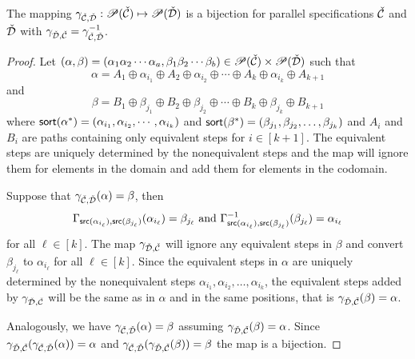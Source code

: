 \begin{proposition}
The mapping $\gamma_{\check{\mathcal{C}},\check{\mathcal{D}}}: \mathscr{P}(\check{\mathcal{C}}) \mapsto \mathscr{P}(\check{\mathcal{D}})$ is a bijection for parallel specifications $\check{\mathcal{C}}$ and $\check{\mathcal{D}}$ with $\gamma_{\check{\mathcal{D}},\check{\mathcal{C}}} = \gamma_{\check{\mathcal{C}},\check{\mathcal{D}}}^{-1}$.
\end{proposition}
\begin{proof}
Let $(\alpha,\beta) = (\alpha_1\alpha_2\dotsm\alpha_a,\beta_1\beta_2\dotsm\beta_b)\in \mathscr{P}(\check{\mathcal{C}}) \times \mathscr{P}(\check{\mathcal{D}})$ such that
\[
    \alpha = A_1 \oplus \alpha_{i_1} \oplus A_2 \oplus \alpha_{i_2} \oplus \dotsm \oplus A_k \oplus \alpha_{i_k} \oplus A_{k+1}
\]
and
\[
    \beta = B_1 \oplus \beta_{j_1} \oplus B_2 \oplus \beta_{j_2} \oplus \dotsm \oplus B_k \oplus \beta_{j_k} \oplus B_{k+1}
\]
where $\textsf{sort}(\alpha^\ast) = (\alpha_{i_1},\alpha_{i_2},\dotsm,\alpha_{i_k})$ and $\textsf{sort}(\beta^\ast) = (\beta_{j_1},\beta_{j_2},\dotsc,\beta_{j_k})$ and $A_i$ and $B_i$ are paths containing only equivalent steps for $i \in [k+1]$. The equivalent steps are uniquely determined by the nonequivalent steps and the map will ignore them for elements in the domain and add them for elements in the codomain.

Suppose that $\gamma_{\check{\mathcal{C}},\check{\mathcal{D}}}(\alpha) = \beta$, then
\[
    \Gamma_{\textsf{src}(\alpha_{i_\ell}),\textsf{src}(\beta_{j_\ell})}(\alpha_{i_\ell}) = \beta_{j_\ell} \text{ and }
    \Gamma_{\textsf{src}(\alpha_{i_\ell}),\textsf{src}(\beta_{j_\ell})}^{-1}(\beta_{j_\ell}) = \alpha_{i_\ell}
\]
for all $\ell \in [k]$. The map $\gamma_{\check{\mathcal{D}},\check{\mathcal{C}}}$ will ignore any equivalent steps in $\beta$ and convert $\beta_{j_\ell}$ to $\alpha_{i_\ell}$ for all $\ell \in [k]$. Since the equivalent steps in $\alpha$ are uniquely determined by the nonequivalent steps $\alpha_{i_1}, \alpha_{i_2}, \dotsc, \alpha_{i_k}$, the equivalent steps added by $\gamma_{\check{\mathcal{D}},\check{\mathcal{C}}}$ will be the same as in $\alpha$ and in the same positions, that is $\gamma_{\check{\mathcal{D}},\check{\mathcal{C}}}(\beta) = \alpha$.

Analogously, we have $\gamma_{\check{\mathcal{C}},\check{\mathcal{D}}}(\alpha) = \beta$ assuming $\gamma_{\check{\mathcal{D}},\check{\mathcal{C}}}(\beta) = \alpha$. Since $\gamma_{\check{\mathcal{D}},\check{\mathcal{C}}}(\gamma_{\check{\mathcal{C}},\check{\mathcal{D}}}(\alpha)) = \alpha$ and $\gamma_{\check{\mathcal{C}},\check{\mathcal{D}}}(\gamma_{\check{\mathcal{D}},\check{\mathcal{C}}}(\beta)) = \beta$ the map is a bijection.
\end{proof}

